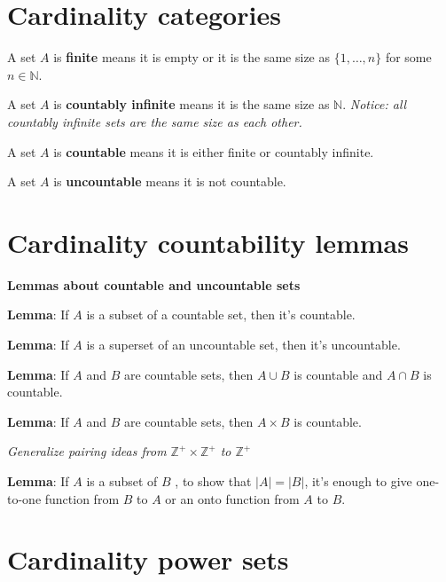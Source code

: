 \documentclass[12pt, oneside]{article}
\begin{document}
\section*{Cardinality categories}


A set $A$ is {\bf finite} means it is empty or it is the same size as $\{ 1, \ldots, n \}$ for some $n \in \mathbb{N}$.

A set $A$ is {\bf countably infinite} means it is the same size as $\mathbb{N}$. {\it Notice: 
all countably infinite sets are the same size as each other.}

A set $A$ is {\bf countable} means it is either finite or countably infinite.

A set $A$ is {\bf uncountable} means it is not countable. \vfill
\section*{Cardinality countability lemmas}


{\bf Lemmas about countable and uncountable sets}

{\bf Lemma}: If $A$ is a subset of a countable set, then it's countable.

\vspace{80pt}

{\bf Lemma}: If $A$ is a superset of an uncountable set, then it's uncountable.

\vspace{80pt}

{\bf Lemma}: If $A$ and $B$ are countable sets, then $A \cup B$ is countable
and $A \cap B$ is countable.

\vspace{80pt}

{\bf Lemma}: If $A$ and $B$ are countable sets, then $A \times B$ is countable.

{\it Generalize pairing ideas from $\mathbb{Z}^+ \times \mathbb{Z}^+$ to $\mathbb{Z}^+$}

\vspace{50pt}

{\bf Lemma}: If $A$ is a subset of $B$ , to show that $|A| = |B|$, 
it's enough to give one-to-one function from $B$ to $A$ or an onto function 
from $A$ to $B$.

\vspace{80pt}
 \vfill
\section*{Cardinality power sets}
\end{document}
